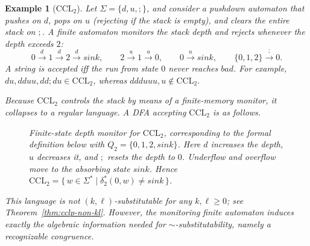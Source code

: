 \documentclass[11pt,a4paper]{article}
\newtheorem{example}[theorem]{Example}
\begin{document}
\begin{example}[$\mathrm{CCL}_2$]\label{ex:ccl2-intro}
Let $\Sigma=\{d,u,;\}$, and consider a pushdown automaton that pushes on $d$, pops on $u$ (rejecting if the stack is empty), and clears the entire stack on $;$. A finite automaton monitors the stack depth and rejects whenever the depth exceeds $2$:
\[
  0 \xrightarrow{d} 1 \xrightarrow{d} 2 \xrightarrow{d} \mathit{sink},\qquad
  2 \xrightarrow{u} 1 \xrightarrow{u} 0,\qquad
  0 \xrightarrow{u} \mathit{sink},\qquad
  \{0,1,2\} \xrightarrow{;} 0.
\]
A string is accepted iff the run from state $0$ never reaches $\mathit{bad}$. For example, $du,dduu,dd;du\in\mathrm{CCL}_2$, whereas $ddduuu,u\notin\mathrm{CCL}_2$.

Because $\mathrm{CCL}_2$ controls the stack by means of a finite-memory monitor, it collapses to a regular language. A DFA accepting $\mathrm{CCL}_2$ is as follows.

\begin{figure}[H]
\centering
{}
\caption{Finite-state depth monitor for $\mathrm{CCL}_2$, corresponding to the formal definition below with $Q_2=\{0,1,2,\mathit{sink}\}$. Here $d$ increases the depth, $u$ decreases it, and $;$ resets the depth to $0$. Underflow and overflow move to the absorbing state $\mathit{sink}$. Hence $\mathrm{CCL}_2=\{\,w\in\Sigma^*\mid \delta_2^*(0,w)\neq\mathit{sink}\,\}$.}
\label{fig:ccl2-dfa}
\end{figure}

This language is not $(k,\ell)$-substitutable for any $k,\ell\ge0$; see Theorem~\ref{thm:cclp-non-kl}. However, the monitoring finite automaton induces exactly the algebraic information needed for $\sim$-substitutability, namely a recognizable congruence.
\end{example}
\end{document}
